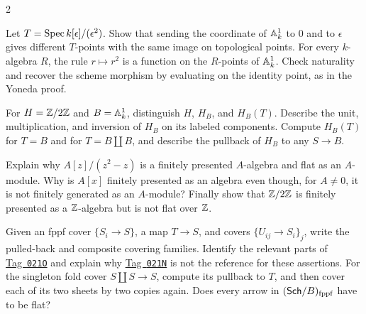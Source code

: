 \documentclass[12pt]{memoir}
\newcommand{\BGtag}[1]{\href{https://stacks.math.columbia.edu/tag/#1}{Tag~\texttt{#1}}}
\begin{document}
\begin{multicols}{2}
\begin{Ej}\label{ex:testpoints}
Let $T=\operatorname{Spec} k[\epsilon]/(\epsilon^2)$. Show that sending the
coordinate of $\mathbb{A}^1_k$ to $0$ and to $\epsilon$ gives different
$T$-points with the same image on topological points. For every
$k$-algebra $R$, the rule $r\mapsto r^2$ is a function on the
$R$-points of $\mathbb{A}^1_k$. Check naturality and recover the scheme
morphism by evaluating on the identity point, as in the Yoneda proof.
\end{Ej}

\begin{Ej}\label{ex:groupobjects}
For $H=\mathbb{Z}/2\mathbb{Z}$ and $B=\mathbb{A}^1_k$, distinguish $H$, $H_B$, and
$H_B(T)$. Describe the unit, multiplication, and inversion of $H_B$
on its labeled components. Compute $H_B(T)$ for $T=B$ and for
$T=B\amalg B$, and describe the pullback of $H_B$ to any $S\to B$.
\end{Ej}

\begin{Ej}\label{ex:fpflat}
Explain why $A[z]/(z^2-z)$ is a finitely presented $A$-algebra and
flat as an $A$-module. Why is $A[x]$ finitely presented as an algebra
even though, for $A\ne0$, it is not finitely generated as an
$A$-module? Finally show that $\mathbb{Z}/2\mathbb{Z}$ is finitely presented as a
$\mathbb{Z}$-algebra but is not flat over $\mathbb{Z}$.
\end{Ej}

\begin{Ej}\label{ex:coveroperations}
Given an fppf cover $\{S_i\to S\}$, a map $T\to S$, and covers
$\{U_{ij}\to S_i\}_j$, write the pulled-back and composite covering
families. Identify the relevant parts of \BGtag{021O} and explain
why \BGtag{021N} is not the reference for these assertions.
For the singleton fold cover $S\amalg S\to S$, compute its pullback
to $T$, and then cover each of its two sheets by two copies again.
Does every arrow in $(\mathsf{Sch}/B)_{\mathrm{fppf}}$ have to be flat?
\end{Ej}

\end{multicols}
\clearpage
\end{document}
